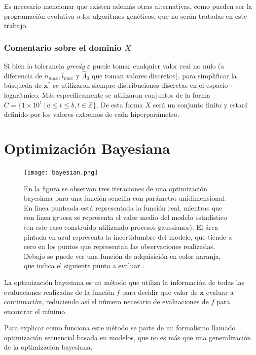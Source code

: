 Es necesario mencionar que existen además otras alternativas, como pueden ser la programación evolutiva o los algoritmos genéticos, que no serán tratadas en este trabajo.


\subsubsection*{Comentario sobre el dominio $X$}


Si bien la tolerancia \textit{greedy} $\varepsilon$ puede tomar cualquier valor real no nulo (a diferencia de $n_{max}, l_{max}$ y $\hat{\Lambda}_0$ que toman valores discretos), para simplificar la búsqueda de $\textbf{x}^*$ se utilizaron siempre distribuciones discretas en el espacio logarítmico. Más específicamente se utilizaron conjuntos de la forma $C = \{1\times 10^{t} \  | \ a \leq t \leq b,  t \in {\mathbb{Z}} \}$. De esta forma $X$ será un conjunto finito y estará definido por los valores extremos de cada hiperparámetro. 


\section{Optimización Bayesiana}

\begin{figure}[h!]
\centering
\texttt{[image: bayesian.png]}
\caption{En la figura se observan tres iteraciones de una optimización bayesiana para una función sencilla con parámetro unidimensional. En linea punteada está representada la función real, mientras que con linea gruesa se representa el valor medio del modelo estadístico (en este caso construido utilizando procesos gaussianos). El área pintada en azul representa la incertidumbre del modelo, que tiende a cero en los puntos que representan las observaciones realizadas. Debajo se puede ver una función de adquisición en color naranja, que indica el siguiente punto a evaluar \cite{Feurer2019}.}
\label{fig:bayesian}
\end{figure}

La optimización bayesiana es un método que utiliza la información de todas las evaluaciones realizadas de la función $f$ para decidir que valor de $\textbf{x}$ evaluar a continuación, reduciendo así el número necesario de evaluaciones de $f$ para encontrar el mínimo.

Para explicar como funciona este método se parte de un formalismo llamado optimización secuencial basada en modelos, que no es más que una generalización de la optimización bayesiana.

